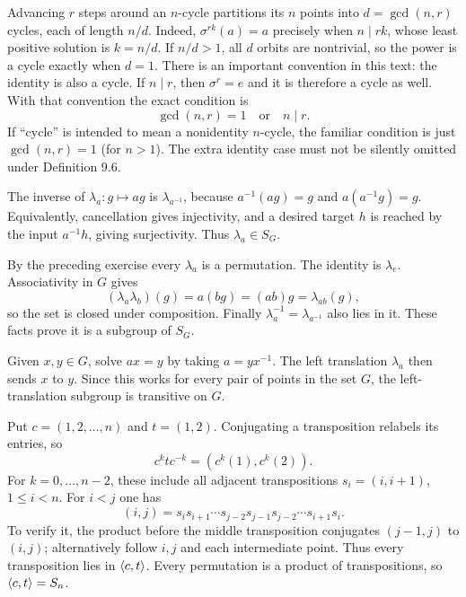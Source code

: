 \idea Advancing $r$ steps around an $n$-cycle partitions its $n$ points into $d=\gcd(n,r)$ cycles, each of length $n/d$.
Indeed, $\sigma^{rk}(a)=a$ precisely when $n\mid rk$, whose least positive solution is $k=n/d$. If $n/d>1$, all $d$ orbits are nontrivial, so the power is a cycle exactly when $d=1$.
There is an important convention in this text: the identity is also a cycle. If $n\mid r$, then $\sigma^r=e$ and it is therefore a cycle as well. With that convention the exact condition is
\[\boxed{\gcd(n,r)=1\quad\text{or}\quad n\mid r.}\]
If ``cycle'' is intended to mean a nonidentity $n$-cycle, the familiar condition is just $\gcd(n,r)=1$ (for $n>1$). The extra identity case must not be silently omitted under Definition 9.6.

The inverse of $\lambda_a:g\mapsto ag$ is $\lambda_{a^{-1}}$, because $a^{-1}(ag)=g$ and $a(a^{-1}g)=g$. Equivalently, cancellation gives injectivity, and a desired target $h$ is reached by the input $a^{-1}h$, giving surjectivity. Thus $\lambda_a\in S_G$.

By the preceding exercise every $\lambda_a$ is a permutation. The identity is $\lambda_e$. Associativity in $G$ gives
\[(\lambda_a\lambda_b)(g)=a(bg)=(ab)g=\lambda_{ab}(g),\]
so the set is closed under composition. Finally $\lambda_a^{-1}=\lambda_{a^{-1}}$ also lies in it. These facts prove it is a subgroup of $S_G$.

Given $x,y\in G$, solve $ax=y$ by taking $a=yx^{-1}$. The left translation $\lambda_a$ then sends $x$ to $y$. Since this works for every pair of points in the set $G$, the left-translation subgroup is transitive on $G$.

Put $c=(1,2,\ldots,n)$ and $t=(1,2)$. Conjugating a transposition relabels its entries, so
\[c^k t c^{-k}=(c^k(1),c^k(2)).\]
For $k=0,\ldots,n-2$, these include all adjacent transpositions $s_i=(i,i+1)$, $1\le i<n$. For $i<j$ one has
\[(i,j)=s_i s_{i+1}\cdots s_{j-2}s_{j-1}s_{j-2}\cdots s_{i+1}s_i.\]
To verify it, the product before the middle transposition conjugates $(j-1,j)$ to $(i,j)$; alternatively follow $i,j$ and each intermediate point. Thus every transposition lies in $\langle c,t\rangle$. Every permutation is a product of transpositions, so $\langle c,t\rangle=S_n$.
